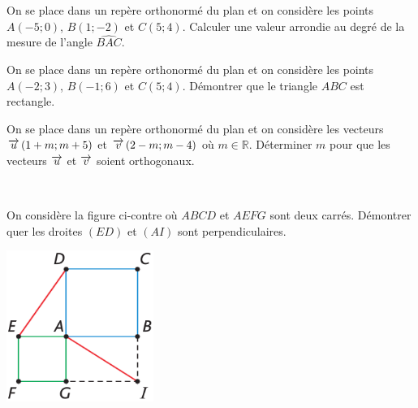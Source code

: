 \documentclass[11pt]{article}
\begin{document}
\begin{exo}
  On se place dans un repère orthonormé du plan et on considère les points
  $A(-5; 0)$, $B(1; -2)$ et $C(5; 4)$. Calculer une valeur arrondie au degré de
  la mesure de l'angle $\widehat{BAC}$.
\end{exo}

\begin{exo}
  On se place dans un repère orthonormé du plan et on considère les points
  $A(-2; 3)$, $B(-1; 6)$ et $C(5; 4)$. Démontrer que le triangle $ABC$ est
  rectangle.
\end{exo}

\begin{exo}
  On se place dans un repère orthonormé du plan et on considère les vecteurs
  $\overrightarrow{u}\left( 1+m; m+5 \right)$ et $\overrightarrow{v}\left( 2-m; m-4 \right)$ où
  $m\in\mathbb{R}$. Déterminer $m$ pour que les vecteurs $\overrightarrow{u}$ et $\overrightarrow{v}$
  soient orthogonaux.
\end{exo}

\begin{exo}~\\[-8mm]
  \begin{minipage}[]{.5\textwidth}
    On considère la figure ci-contre où $ABCD$ et $AEFG$ sont deux carrés.
    Démontrer quer les droites $(ED)$ et $(AI)$ sont perpendiculaires.
  \end{minipage}
  \begin{minipage}[]{.5\textwidth}
    \begin{center}
      \includegraphics[scale=.5]{initiative.png}
    \end{center}
  \end{minipage}
\end{exo}
\end{document}
